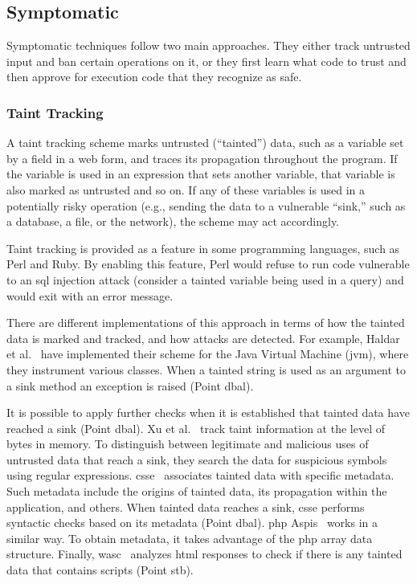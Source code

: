 \documentclass[10pt,journal,compsoc]{IEEEtran}
\begin{document}
\subsection{Symptomatic}

Symptomatic techniques follow two main approaches. They either track
untrusted input and ban certain operations on it, or they first learn what
code to trust and then approve for execution code that they recognize
as safe.

\subsubsection{Taint Tracking}
\label{sec:taint}

A taint tracking scheme marks untrusted (``tainted'') data, such as
a variable set by a field in a web form, and traces its propagation
throughout the program. If the variable is used in an expression that
sets another variable, that variable is also marked as untrusted and
so on. If any of these variables is used in a potentially risky
operation (e.g., sending the data to a vulnerable ``sink,'' such as
a database, a file, or the network), the scheme may act accordingly.

Taint tracking is provided as a feature in some programming languages,
such as Perl and Ruby. By enabling this feature, Perl would refuse to
run code vulnerable to an {\sc sql} injection attack (consider a
tainted variable being used in a query) and would exit with an error
message.

There are different implementations of this approach
in terms of how the tainted data is marked and tracked,
and how attacks are detected.
For example, Haldar et al.~\cite{HCF05} have implemented
their scheme for the Java Virtual Machine ({\sc jvm}),
where they instrument various classes. When a
tainted string is used as an argument to a sink method
an exception is raised (Point {\sc dbal}).

It is possible to apply further checks when it is established that
tainted data have reached a sink (Point {\sc dbal}).
Xu et al.~\cite{XBS06} track taint information at the level of bytes in
memory. To distinguish between legitimate and malicious uses of
untrusted data that reach a sink, they search the data for suspicious
symbols using regular expressions. {\sc csse}~\cite{PB05}
associates tainted data with specific metadata. Such metadata include
the origins of tainted data, its propagation within the application,
and others. When tainted data reaches a sink, {\sc csse} performs
syntactic checks based on its metadata (Point {\sc dbal}).
{\sc php} Aspis~\cite{PMP11} works in a similar way. To obtain
metadata, it takes advantage of the  {\sc php} array data structure.
Finally, {\sc wasc}~\cite{NLC07} analyzes {\sc html} responses to check
if there is any tainted data that contains scripts (Point {\sc s}t{\sc b}).
\end{document}
